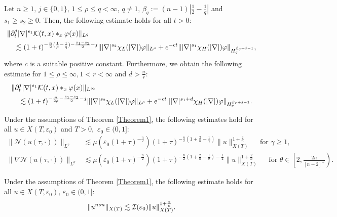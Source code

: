 \documentclass[10pt,a4paper]{amsart}
\begin{document}
\begin{lemma}\label{LinearEstimates}
    Let $n \geq 1,\, j \in \{ 0,1\}, \,
    1 \leq \rho \leq q < \infty$, $q \ne 1$, $\beta_q := (n-1)\left|\frac{1}{2}-\frac{1}{q}\right|$ and $s_1 \geq s_2 \geq 0$.  Then, the following estimate holds for all $t > 0$:
    \begin{align*}
        &\|\partial_t^j |\nabla|^{s_1} \mathcal{K}(t,x)\ast_x \varphi(x)\|_{L^q}\\ &\quad\lesssim (1+t)^{-\frac{n}{2}(\frac{1}{\rho}-\frac{1}{q})-\frac{s_1-s_2}{2}-j} \||\nabla|^{s_2} \chi_{\rm L}(|\nabla|)\varphi\|_{L^{\rho}} + e^{-ct} \||\nabla|^{s_1}\chi_{\rm H}(|\nabla|) \varphi\|_{H_{q}^{\beta_q+j-1}},
        \end{align*}
        where $c$ is a suitable positive constant.
    Furthermore, we obtain the following estimate for $ 1\leq \rho \leq \infty, 1 < r < \infty$ and $d > \displaystyle\frac{n}{r}$:
    \begin{align*}
        &\|\partial_t^j |\nabla|^{s_1}\mathcal{K}(t,x) \ast_x \varphi(x) \|_{L^{\infty}}\\ &\quad\lesssim (1+t)^{-\frac{n}{2\rho}-\frac{s_1-s_2}{2}-j} \||\nabla|^{s_2} \chi_{\rm L}(|\nabla|) \varphi\|_{L^\rho} + e^{-ct} \||\nabla|^{s_1 + d} \chi_{\rm H}(|\nabla|) \varphi\|_{H^{\beta_r+j -1}_r}.
    \end{align*}
\end{lemma}

\begin{lemma}\label{lemma1.3}
    Under the assumptions of Theorem \ref{Theorem1}, the following estimates hold for all $u \in X(T,\varepsilon_0)$ and $T >0, \,\, \varepsilon_0 \in (0, 1]$:
    \begin{align*}
    \|\mathcal{N}(u(\tau,\cdot))\|_{L^{\gamma}} &\lesssim \mu\left(\varepsilon_0 (1+\tau)^{-\frac{n}{2}}\right) (1+\tau)^{-\frac{n}{2}(1+\frac{2}{n}-\frac{1}{\gamma})}  \|u\|_{X(T)}^{1+\frac{2}{n}} \quad\text{ for } \gamma \geq 1,\\
    \|\nabla \mathcal{N}(u(\tau,\cdot))\|_{L^{\theta}} &\lesssim \mu\left(\varepsilon_0 (1+\tau)^{-\frac{n}{2}}\right) (1+\tau)^{-\frac{n}{2}(1+\frac{2}{n}-\frac{1}{\theta})-\frac{1}{2}}  \|u\|_{X(T)}^{1+\frac{2}{n}} \quad \text{ for } \theta \in \left[2, \frac{2n}{[n-2]^+}\right).
    \end{align*}
\end{lemma}

\begin{proposition}\label{Pro1.1}
     Under the assumptions of Theorem \ref{Theorem1}, the following estimate holds for all $u \in X(T, \varepsilon_0),\, \varepsilon_0 \in (0, 1]$:
     \begin{align*}
         \|u^{\rm non}\|_{X(T)} \lesssim \mathcal{I}(\varepsilon_0)\|u\|_{X(T)}^{1+\frac{2}{n}}.
     \end{align*}
   
\end{proposition}
\end{document}
